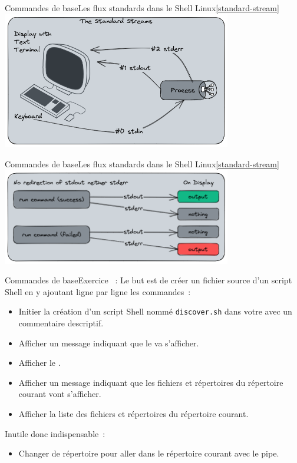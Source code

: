 \documentclass{beamer}
\begin{document}
    \begin{frame}{Commandes de base}{Les flux standards dans le Shell Linux\cref{standard-stream}}
        \centering
        \includegraphics[width=10cm]{image/standard-stream-computer}
    \end{frame}

    \begin{frame}{Commandes de base}{Les flux standards dans le Shell Linux\cref{standard-stream}}
        \centering
        \includegraphics[width=10cm]{image/shell-stream-no-redirect}
    \end{frame}

    \begin{frame}{Commandes de base}{Exercice \execcounterdispinc{}~:}
        Le but est de créer un fichier source d'un script Shell en y ajoutant ligne par ligne les commandes~:
        \begin{itemize}
            \item Initier la création d'un script Shell nommé \lstinline{discover.sh} dans votre  avec un commentaire descriptif.
            \item Afficher un message indiquant que le  va s'afficher.
            \item Afficher le .
            \item Afficher un message indiquant que les fichiers et répertoires du répertoire courant vont s'afficher.
            \item Afficher la liste des fichiers et répertoires du répertoire courant.
        \end{itemize}

        Inutile donc indispensable~:
        \begin{itemize}
            \item Changer de répertoire pour aller dans le répertoire courant avec le pipe.
        \end{itemize}
    \end{frame}
\end{document}
